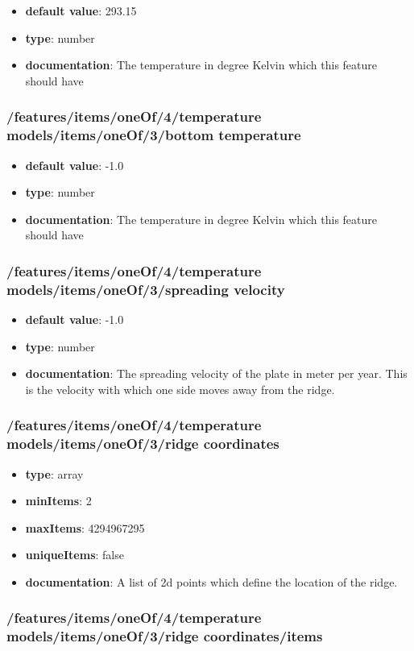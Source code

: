 \begin{itemize}\item {\bf default value}: 293.15
\item {\bf type}: number
\item {\bf documentation}: The temperature in degree Kelvin which this feature should have
\end{itemize}\subsubsection{/features/items/oneOf/4/temperature models/items/oneOf/3/bottom temperature}
\begin{itemize}\item {\bf default value}: -1.0
\item {\bf type}: number
\item {\bf documentation}: The temperature in degree Kelvin which this feature should have
\end{itemize}\subsubsection{/features/items/oneOf/4/temperature models/items/oneOf/3/spreading velocity}
\begin{itemize}\item {\bf default value}: -1.0
\item {\bf type}: number
\item {\bf documentation}: The spreading velocity of the plate in meter per year. This is the velocity with which one side moves away from the ridge.
\end{itemize}\subsubsection{/features/items/oneOf/4/temperature models/items/oneOf/3/ridge coordinates}
\begin{itemize}\item {\bf type}: array
\item {\bf minItems}: 2
\item {\bf maxItems}: 4294967295
\item {\bf uniqueItems}: false
\item {\bf documentation}: A list of 2d points which define the location of the ridge.
\end{itemize}\subsubsection{/features/items/oneOf/4/temperature models/items/oneOf/3/ridge coordinates/items}
